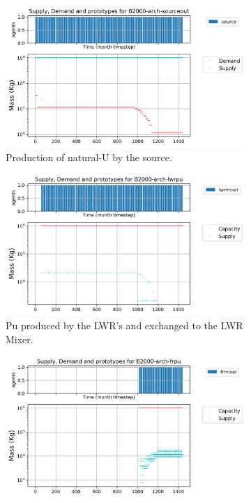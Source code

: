 \documentclass[11pt,letterpaper]{article}
\begin{document}
\begin{figure}[]
	\centering
	\begin{subfigure}[t]{.8\textwidth}
		\centering
		\includegraphics[width=\linewidth]{B2000-arch-sourceout.png} 
		\caption{Production of natural-U by the source.}
		\label{fig:23-arch-sourceout}
	\end{subfigure}
	\vspace{.9cm}
	\begin{subfigure}[t]{.45\textwidth}
		\centering
		\includegraphics[width=\linewidth]{B2000-arch-lwrpu.png} 
		\caption{Pu produced by the LWR's and exchanged to the LWR Mixer.}
		\label{fig:23-arch-lwrpu}
	\end{subfigure}
	\begin{subfigure}[t]{.45\textwidth}
	\centering
	\includegraphics[width=\linewidth]{B2000-arch-frpu.png} 

\end{subfigure}
\end{figure}
\end{document}
